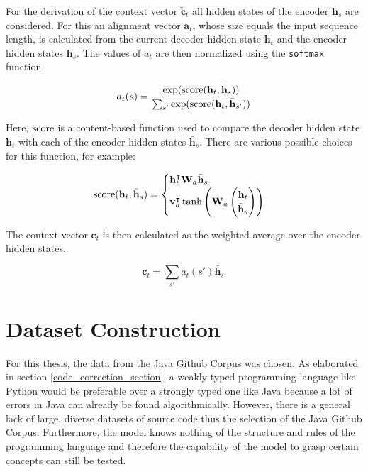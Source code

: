 For the derivation of the context vector \(\tilde{\mathbf{c}}_t\) all hidden states of the encoder \(\bar{\mathbf{h}}_s\) are considered. For this an alignment vector \(\mathbf{a}_t\), whose size equals the input sequence length, is calculated from the current decoder hidden state \(\mathbf{h}_t\) and the encoder hidden states \(\bar{\mathbf{h}}_s\). The values of \(a_t\) are then normalized using the \texttt{softmax} function.

\begin{equation*}
  a_t(s) = \frac
            {\exp(\operatorname{score}(\mathbf{h}_t, \bar{\mathbf{h}}_s))}
            {\sum_{s'} \exp(\operatorname{score}(\mathbf{h}_t, \bar{\mathbf{h}}_{s'}))}
\end{equation*}

Here, \(\operatorname{score}\) is a content-based function used to compare the decoder hidden state \(\mathbf{h}_t\) with each of the encoder hidden states \(\bar{\mathbf{h}}_s\). There are various possible choices for this function, for example:

\begin{equation*}
  \operatorname{score}(\mathbf{h}_t, \bar{\mathbf{h}}_s) =
  \begin{cases}
    \mathbf{h}_t^\intercal \mathbf{W}_a \bar{\mathbf{h}}_s \\
    \mathbf{v}_a^\intercal \tanh \left(\mathbf{W}_a \begin{pmatrix} \mathbf{h}_t \\ \bar{\mathbf{h}}_s \end{pmatrix} \right)
  \end{cases}
\end{equation*}

The context vector \(\mathbf{c}_t\) is then calculated as the weighted average over the encoder hidden states.

\begin{equation*}
  \mathbf{c}_t = \sum_{s'} a_t(s') \bar{\mathbf{h}}_{s'}
\end{equation*}

\section{Dataset Construction}

For this thesis, the data from the Java Github Corpus \cite{java_dataset} was chosen. As elaborated in section \ref{code_correction_section}, a weakly typed programming language like Python would be preferable over a strongly typed one like Java because a lot of errors in Java can already be found algorithmically. However, there is a general lack of large, diverse datasets of source code thus the selection of the Java Github Corpus. Furthermore, the model knows nothing of the structure and rules of the programming language and therefore the capability of the model to grasp certain concepts can still be tested.

